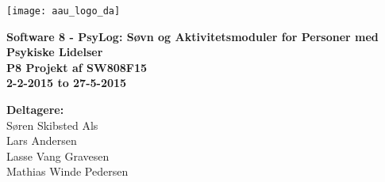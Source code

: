\hspace*{-1cm}\parbox[b][\textheight][t]{\textwidth}
{

\begin{center}
	\texttt{[image: aau\_logo\_da]}\\
	\vspace{0.25cm}
\end{center} 

\vspace{1cm}
\begin{center}

\textbf{\Huge {Software 8 - PsyLog: Søvn og Aktivitetsmoduler for Personer med Psykiske Lidelser}} \\ \vspace{0.5cm}
\textbf{\Large P8 Projekt af SW808F15}\\ \vspace{0.5cm}
\textbf{\large 2-2-2015 to 27-5-2015}\\
\end{center}



\vspace{0.25cm}
\begin{center}
\item {\textbf{Deltagere:}} \\
Søren Skibsted Als\\
Lars Andersen\\
Lasse Vang Gravesen\\
Mathias Winde Pedersen
\end{center}

\thispagestyle{empty}

\newpage
\thispagestyle{empty}
\mbox{}
}